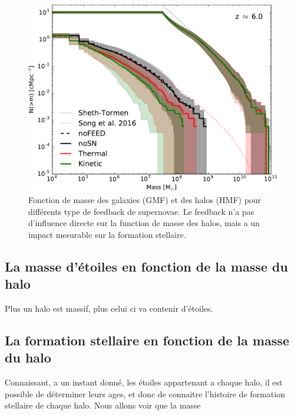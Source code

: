 \begin{figure}
		\includegraphics[width=.95\linewidth]{img/03/ghmf.pdf}
        \caption{Fonction de masse des galaxies (GMF) et des halos (HMF) pour différents type de feedback de supernovae.
        Le feedback n'a pas d'influence directe sur la function de masse des halos, mais a un impact mesurable sur la formation stellaire.
 		\label{fig:ghmf}}
\end{figure}



\subsection{La masse d'étoiles en fonction de la masse du halo}
Plus un halo est massif, plus celui ci va contenir d'étoiles.



\subsection{La formation stellaire en fonction de la masse du halo}
\label{sec:sfr_halo}
Connaissant, a un instant donné, les étoiles appartenant a chaque halo, il est possible de déterminer leurs ages, et donc de connaitre l'histoire de formation stellaire de chaque halo.
Nous allons voir que la masse 


